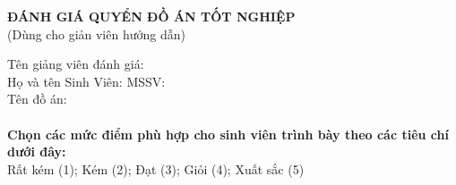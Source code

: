 
\newpage \pagestyle{empty}
\begin{center}
    \textbf{\fontsize{14pt}{0pt}\selectfont ĐÁNH GIÁ QUYỂN ĐỒ ÁN TỐT NGHIỆP}\\
    \vspace{10pt}
    \fontsize{14pt}{0pt}\selectfont (Dùng cho giản viên hướng dẫn) 
\end{center}
\vspace{14pt}
\fontsize{13pt}{20pt}\selectfont Tên giảng viên đánh giá:\\
\fontsize{13pt}{20pt}\selectfont Họ và tên Sinh Viên:
\hspace{5.5cm}
\fontsize{13pt}{20pt}\selectfont MSSV:\\
\fontsize{13pt}{20pt}\selectfont Tên đồ án:\\
\fontsize{13pt}{20pt}\selectfont \\
\textbf{\fontsize{13pt}{20pt}\selectfont Chọn các mức điểm phù hợp cho sinh viên trình bày theo các tiêu chí dưới đây:}\\
\fontsize{13pt}{20pt}\selectfont Rất kém (1); Kém (2); Đạt (3); Giỏi (4); Xuất sắc (5)
